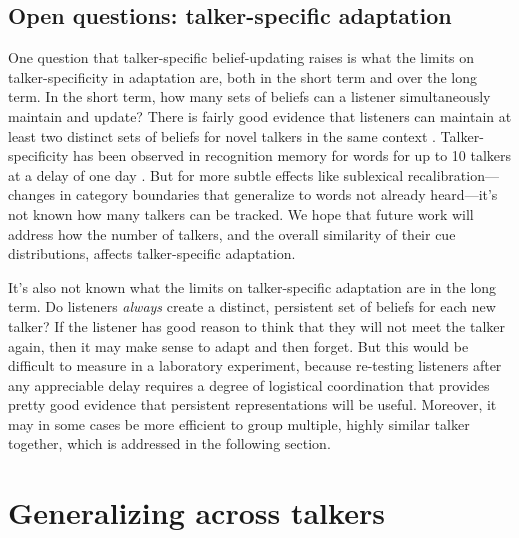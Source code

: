 \subsection{Open questions: talker-specific adaptation}
\label{sec:open-quest-talk-1}

One question that talker-specific belief-updating raises is what the limits on talker-specificity in adaptation are, both in the short term and over the long term.  In the short term, how many sets of beliefs can a listener simultaneously maintain and update?  There is fairly good evidence that listeners can maintain at least two distinct sets of beliefs for novel talkers in the same context \autocite{Munson2011,Kraljic2007}.   Talker-specificity has been observed in recognition memory for words for up to 10 talkers at a delay of one day \autocite{Goldinger1996}.  But for more subtle effects like sublexical recalibration---changes in category boundaries that generalize to words not already heard---it's not known how many talkers can be tracked.  We hope that future work will address how the number of talkers, and the overall similarity of their cue distributions, affects talker-specific adaptation.

It's also not known what the limits on talker-specific adaptation are in the long term. Do listeners \emph{always} create a distinct, persistent set of beliefs for each new talker?  If the listener has good reason to think that they will not meet the talker again, then it may make sense to adapt and then forget.  But this would be difficult to measure in a laboratory experiment, because re-testing listeners after any appreciable delay requires a degree of logistical coordination that provides pretty good evidence that persistent representations will be useful.  Moreover, it may in some cases be more efficient to group multiple, highly similar talker together, which is addressed in the following section.


\section{Generalizing across talkers}
\label{sec:gener-across-talk}


